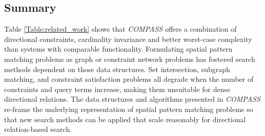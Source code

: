 {{\subsection{Summary}

\par{
    Table \ref{Table:related_work} shows that \emph{COMPASS} offers a combination of directional constraints, cardinality invariance and better worst-case complexity than systems with comparable functionality.
    Formulating spatial pattern matching problems as graph or constraint network problems has fostered search methods dependent on those data structures. 
    Set intersection, subgraph matching, and constraint satisfaction problems all degrade when the number of constraints and query terms increase, making them unsuitable for dense directional relations. 
    The data structures and algorithms presented in \emph{COMPASS} re-frame the underlying representation of spatial pattern matching problems so that new search methods can be applied that scale reasonably for directional relation-based search.
}


}}
